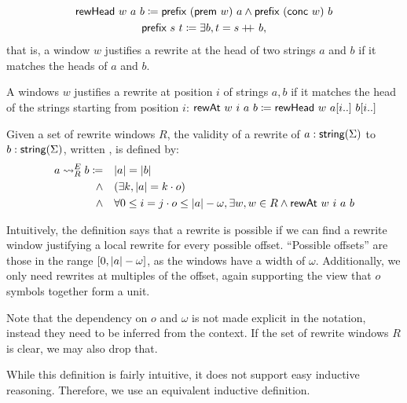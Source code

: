 \begin{definition}\label{def:rewHead}
  \begin{gather*}
    \textsf{rewHead}~w~a~b \coloneqq \textsf{prefix}~(\textsf{prem}~w)~a \land \textsf{prefix}~(\textsf{conc}~w)~b \\
    \textsf{prefix}~s~t \coloneqq \exists b, t = s +\kern-1.3ex+\kern0.8ex{} b,
  \end{gather*}
  that is, a window $w$ justifies a rewrite at the head of two strings $a$ and $b$ if it matches the heads of $a$ and $b$.

  A windows $w$ justifies a rewrite at position $i$ of strings $a, b$ if it matches the head of the strings starting from position $i$:
  $\textsf{rewAt}~w~i~a~b \coloneqq \textsf{rewHead}~w~a[i..]~b[i..]$
\end{definition}

\begin{definition}
  Given a set of rewrite windows $R$, the validity of a rewrite of $a : \textsf{string}{(\Sigma)}$ to $b : \textsf{string}{(\Sigma)}$, written , is defined by:
  \begin{align*}
    a \rightsquigarrow_{R}^E b \coloneqq \quad& |a| = |b| \\
    \land \quad & (\exists k, |a| = k \cdot o) \\
    \land \quad & \forall 0 \le i = j \cdot o \le |a| - \omega, \exists w, w \in R \land \textsf{rewAt}~w~i~a~b 
  \end{align*}
\end{definition}

Intuitively, the definition says that a rewrite is possible if we can find a rewrite window justifying a local rewrite for every possible offset. ``Possible offsets'' are those in the range $[0, |a| - \omega]$, as the windows have a width of $\omega$. Additionally, we only need rewrites at multiples of the offset, again supporting the view that $o$ symbols together form a unit.

Note that the dependency on $o$ and $\omega$ is not made explicit in the notation, instead they need to be inferred from the context. If the set of rewrite windows $R$ is clear, we may also drop that.

While this definition is fairly intuitive, it does not support easy inductive reasoning. Therefore, we use an equivalent inductive definition.


